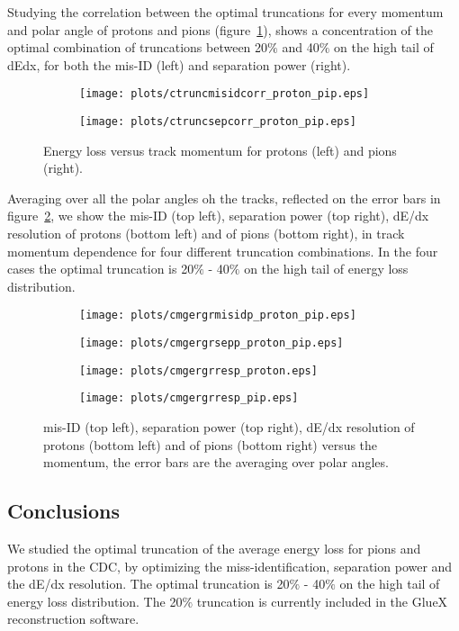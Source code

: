 Studying the correlation between the optimal truncations for every momentum and polar angle of protons and pions (figure~\ref{fig.3.8}), shows a concentration of the optimal combination of truncations between 20$\%$ and 40$\%$ on the high tail of dEdx, for both the mis-ID (left) and separation power (right).
\begin{figure}[H]
    \centering
    \begin{subfigure}[b]{0.45\textwidth}
        \texttt{[image: plots/ctruncmisidcorr\_proton\_pip.eps]}
    \end{subfigure}\hfill
    \begin{subfigure}[b]{0.45\textwidth}
        \texttt{[image: plots/ctruncsepcorr\_proton\_pip.eps]}
    \end{subfigure}
    \caption{Energy loss versus track momentum for protons (left) and pions (right).}
    \label{fig.3.8}
\end{figure}
Averaging over all the polar angles oh the tracks, reflected on the error bars in figure~\ref{fig.3.9}, we show the mis-ID (top left), separation power (top right), dE/dx resolution of protons (bottom left) and of pions (bottom right), in track momentum dependence for four different truncation combinations. In the four cases the optimal truncation is 20$\%$ - 40$\%$ on the high tail of energy loss distribution.
\begin{figure}[H]
    \centering
    \begin{subfigure}[b]{0.45\textwidth}
        \texttt{[image: plots/cmgergrmisidp\_proton\_pip.eps]}
    \end{subfigure}\hfill
    \begin{subfigure}[b]{0.45\textwidth}
        \texttt{[image: plots/cmgergrsepp\_proton\_pip.eps]}
    \end{subfigure}\hfill
    \begin{subfigure}[b]{0.45\textwidth}
        \texttt{[image: plots/cmgergrresp\_proton.eps]}
    \end{subfigure}\hfill
    \begin{subfigure}[b]{0.45\textwidth}
        \texttt{[image: plots/cmgergrresp\_pip.eps]}
    \end{subfigure}
    \caption{mis-ID (top left), separation power (top right), dE/dx resolution of protons (bottom left) and of pions (bottom right) versus the momentum, the error bars are the averaging over polar angles.}
    \label{fig.3.9}
\end{figure}

\subsection{Conclusions}
We studied the optimal truncation of the average energy loss for pions and protons in the CDC, by optimizing the miss-identification, separation power and the dE/dx resolution. The optimal truncation is 20$\%$ - 40$\%$ on the high tail of energy loss distribution. The 20$\%$ truncation is currently included in the GlueX reconstruction software.


